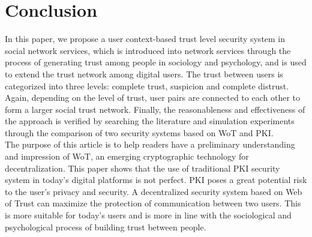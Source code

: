 \section{Conclusion}
In this paper, we propose a user context-based trust level security system in social 
network services, which is introduced into network services through the process of 
generating trust among people in sociology and psychology, and is used to extend the 
trust network among digital users\cite{b22}. The trust between users is categorized into three 
levels: complete trust, suspicion and complete distrust\cite{b10, b14}. Again, depending on the level 
of trust, user pairs are connected to each other to form a larger social trust network\cite{b20}. 
Finally, the reasonableness and effectiveness of the approach is verified by searching 
the literature and simulation experiments through the comparison of two security systems 
based on WoT and PKI\cite{b15, b16}.
\\
The purpose of this article is to help readers have a preliminary understanding and 
impression of WoT, an emerging cryptographic technology for decentralization\cite{b19}. This 
paper shows that the use of traditional PKI security system in today's digital platforms 
is not perfect. PKI poses a great potential risk to the user's privacy and security\cite{b21}. 
A decentralized security system based on Web of Trust can maximize the protection of 
communication between two users. This is more suitable for today's users and is more 
in line with the sociological and psychological process of building trust between people\cite{b24}.